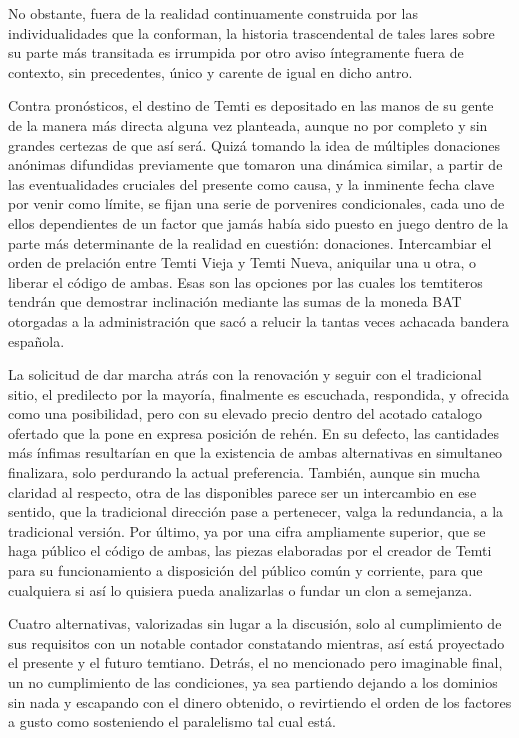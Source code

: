 \documentclass[
]{book}
\begin{document}
No obstante, fuera de la realidad continuamente construida por las individualidades que la conforman, la historia trascendental de tales lares sobre su parte más transitada es irrumpida por otro aviso íntegramente fuera de contexto, sin precedentes, único y carente de igual en dicho antro.

Contra pronósticos, el destino de Temti es depositado en las manos de su gente de la manera más directa alguna vez planteada, aunque no por completo y sin grandes certezas de que así será. Quizá tomando la idea de múltiples donaciones anónimas difundidas previamente que tomaron una dinámica similar, a partir de las eventualidades cruciales del presente como causa, y la inminente fecha clave por venir como límite, se fijan una serie de porvenires condicionales, cada uno de ellos dependientes de un factor que jamás había sido puesto en juego dentro de la parte más determinante de la realidad en cuestión: donaciones. Intercambiar el orden de prelación entre Temti Vieja y Temti Nueva, aniquilar una u otra, o liberar el código de ambas. Esas son las opciones por las cuales los temtiteros tendrán que demostrar inclinación mediante las sumas de la moneda BAT otorgadas a la administración que sacó a relucir la tantas veces achacada bandera española.

La solicitud de dar marcha atrás con la renovación y seguir con el tradicional sitio, el predilecto por la mayoría, finalmente es escuchada, respondida, y ofrecida como una posibilidad, pero con su elevado precio dentro del acotado catalogo ofertado que la pone en expresa posición de rehén. En su defecto, las cantidades más ínfimas resultarían en que la existencia de ambas alternativas en simultaneo finalizara, solo perdurando la actual preferencia. También, aunque sin mucha claridad al respecto, otra de las disponibles parece ser un intercambio en ese sentido, que la tradicional dirección pase a pertenecer, valga la redundancia, a la tradicional versión. Por último, ya por una cifra ampliamente superior, que se haga público el código de ambas, las piezas elaboradas por el creador de Temti para su funcionamiento a disposición del público común y corriente, para que cualquiera si así lo quisiera pueda analizarlas o fundar un clon a semejanza.

Cuatro alternativas, valorizadas sin lugar a la discusión, solo al cumplimiento de sus requisitos con un notable contador constatando mientras, así está proyectado el presente y el futuro temtiano. Detrás, el no mencionado pero imaginable final, un no cumplimiento de las condiciones, ya sea partiendo dejando a los dominios sin nada y escapando con el dinero obtenido, o revirtiendo el orden de los factores a gusto como sosteniendo el paralelismo tal cual está.
\end{document}
